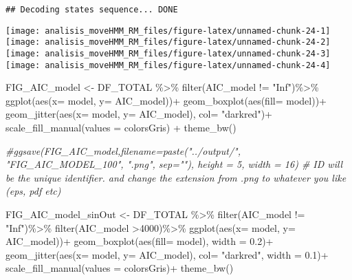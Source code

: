 \documentclass[
]{article}
\newenvironment{Shaded}{\begin{snugshade}}{\end{snugshade}}
\newcommand{\AttributeTok}[1]{\textcolor[rgb]{0.77,0.63,0.00}{#1}}
\newcommand{\CommentTok}[1]{\textcolor[rgb]{0.56,0.35,0.01}{\textit{#1}}}
\newcommand{\DecValTok}[1]{\textcolor[rgb]{0.00,0.00,0.81}{#1}}
\newcommand{\FloatTok}[1]{\textcolor[rgb]{0.00,0.00,0.81}{#1}}
\newcommand{\FunctionTok}[1]{\textcolor[rgb]{0.00,0.00,0.00}{#1}}
\newcommand{\NormalTok}[1]{#1}
\newcommand{\OtherTok}[1]{\textcolor[rgb]{0.56,0.35,0.01}{#1}}
\newcommand{\SpecialCharTok}[1]{\textcolor[rgb]{0.00,0.00,0.00}{#1}}
\newcommand{\StringTok}[1]{\textcolor[rgb]{0.31,0.60,0.02}{#1}}
\begin{document}
\begin{verbatim}
## Decoding states sequence... DONE
\end{verbatim}

\texttt{[image: analisis\_moveHMM\_RM\_files/figure-latex/unnamed-chunk-24-1]}
\texttt{[image: analisis\_moveHMM\_RM\_files/figure-latex/unnamed-chunk-24-2]}
\texttt{[image: analisis\_moveHMM\_RM\_files/figure-latex/unnamed-chunk-24-3]}
\texttt{[image: analisis\_moveHMM\_RM\_files/figure-latex/unnamed-chunk-24-4]}

\begin{Shaded}
\begin{Highlighting}[]
\NormalTok{FIG\_AIC\_model }\OtherTok{\textless{}{-}}\NormalTok{ DF\_TOTAL }\SpecialCharTok{\%\textgreater{}\%} 
  \FunctionTok{filter}\NormalTok{(AIC\_model }\SpecialCharTok{!=} \StringTok{"Inf"}\NormalTok{)}\SpecialCharTok{\%\textgreater{}\%} 
  \FunctionTok{ggplot}\NormalTok{(}\FunctionTok{aes}\NormalTok{(}\AttributeTok{x=}\NormalTok{ model, }\AttributeTok{y=}\NormalTok{ AIC\_model))}\SpecialCharTok{+}
  \FunctionTok{geom\_boxplot}\NormalTok{(}\FunctionTok{aes}\NormalTok{(}\AttributeTok{fill=}\NormalTok{ model))}\SpecialCharTok{+}
  \FunctionTok{geom\_jitter}\NormalTok{(}\FunctionTok{aes}\NormalTok{(}\AttributeTok{x=}\NormalTok{ model, }\AttributeTok{y=}\NormalTok{ AIC\_model), }\AttributeTok{col=} \StringTok{"darkred"}\NormalTok{)}\SpecialCharTok{+}
  \FunctionTok{scale\_fill\_manual}\NormalTok{(}\AttributeTok{values =}\NormalTok{ colorsGris) }\SpecialCharTok{+}
  \FunctionTok{theme\_bw}\NormalTok{()}

\CommentTok{\#ggsave(FIG\_AIC\_model,filename=paste("../output/", "FIG\_AIC\_MODEL\_100", ".png", sep=""),  height = 5, width = 16) \# ID will be the unique identifier. and change the extension from .png to whatever you like (eps, pdf etc)}

\NormalTok{FIG\_AIC\_model\_sinOut }\OtherTok{\textless{}{-}}\NormalTok{ DF\_TOTAL }\SpecialCharTok{\%\textgreater{}\%} 
  \FunctionTok{filter}\NormalTok{(AIC\_model }\SpecialCharTok{!=} \StringTok{"Inf"}\NormalTok{)}\SpecialCharTok{\%\textgreater{}\%} 
  \FunctionTok{filter}\NormalTok{(AIC\_model }\SpecialCharTok{\textgreater{}}\DecValTok{4000}\NormalTok{)}\SpecialCharTok{\%\textgreater{}\%} 
  \FunctionTok{ggplot}\NormalTok{(}\FunctionTok{aes}\NormalTok{(}\AttributeTok{x=}\NormalTok{ model, }\AttributeTok{y=}\NormalTok{ AIC\_model))}\SpecialCharTok{+}
  \FunctionTok{geom\_boxplot}\NormalTok{(}\FunctionTok{aes}\NormalTok{(}\AttributeTok{fill=}\NormalTok{ model), }\AttributeTok{width =} \FloatTok{0.2}\NormalTok{)}\SpecialCharTok{+}
  \FunctionTok{geom\_jitter}\NormalTok{(}\FunctionTok{aes}\NormalTok{(}\AttributeTok{x=}\NormalTok{ model, }\AttributeTok{y=}\NormalTok{ AIC\_model), }\AttributeTok{col=} \StringTok{"darkred"}\NormalTok{, }\AttributeTok{width =} \FloatTok{0.1}\NormalTok{)}\SpecialCharTok{+}
  \FunctionTok{scale\_fill\_manual}\NormalTok{(}\AttributeTok{values =}\NormalTok{ colorsGris)}\SpecialCharTok{+}
  \FunctionTok{theme\_bw}\NormalTok{()}


\end{Highlighting}
\end{Shaded}
\end{document}
